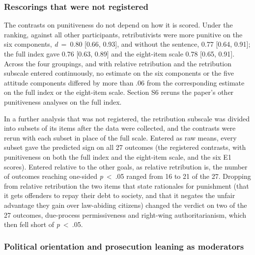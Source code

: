 \subsubsection{Rescorings that were not registered}\label{rescorings-that-were-not-registered}

The contrasts on punitiveness do not depend on how it is scored. Under the ranking, against all other participants, retributivists were more punitive on the six components, \emph{d}~=~0.80 {[}0.66, 0.93{]}, and without the sentence, 0.77 {[}0.64, 0.91{]}; the full index gave 0.76 {[}0.63, 0.89{]} and the eight-item scale 0.78 {[}0.65, 0.91{]}. Across the four groupings, and with relative retribution and the retribution subscale entered continuously, no estimate on the six components or the five attitude components differed by more than .06 from the corresponding estimate on the full index or the eight-item scale. Section S6 reruns the paper's other punitiveness analyses on the full index.

In a further analysis that was not registered, the retribution subscale was divided into subsets of its items after the data were collected, and the contrasts were rerun with each subset in place of the full scale. Entered as raw means, every subset gave the predicted sign on all 27 outcomes (the registered contrasts, with punitiveness on both the full index and the eight-item scale, and the six E1 scores). Entered relative to the other goals, as relative retribution is, the number of outcomes reaching one-sided \emph{p}~\textless{}~.05 ranged from 16 to 21 of the 27. Dropping from relative retribution the two items that state rationales for punishment (that it gets offenders to repay their debt to society, and that it negates the unfair advantage they gain over law-abiding citizens) changed the verdict on two of the 27 outcomes, due-process permissiveness and right-wing authoritarianism, which then fell short of \emph{p}~\textless{}~.05.

\subsubsection{Political orientation and prosecution leaning as moderators}\label{political-orientation-and-prosecution-leaning-as-moderators}


